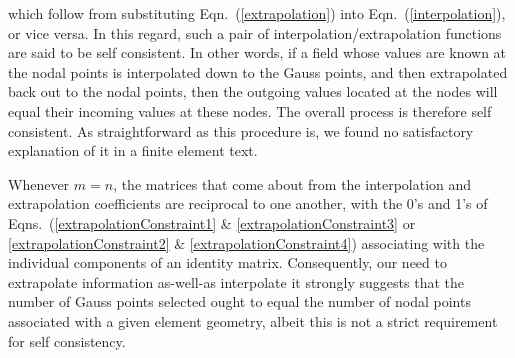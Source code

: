 which follow from substituting Eqn.~(\ref{extrapolation}) into Eqn.~(\ref{interpolation}), or vice versa.  In this regard, such a pair of interpolation\slash extrapolation functions are said to be self consistent.  In other words, if a field whose values are known at the nodal points is interpolated down to the Gauss points, and then extrapolated back out to the nodal points, then the outgoing values located at the nodes will equal their incoming values at these nodes.  The overall process is therefore self consistent.  As straight\-forward as this procedure is, we found no satisfactory explanation of it in a finite element text.

Whenever $m=n$, the matrices that come about from the interpolation and extrapolation coefficients are reciprocal to one another, with the 0's and 1's of Eqns.~(\ref{extrapolationConstraint1} \& \ref{extrapolationConstraint3} or \ref{extrapolationConstraint2} \& \ref{extrapolationConstraint4}) associating with the individual components of an identity matrix.  Consequently, our need to extrapolate information as-well-as interpolate it strongly suggests that the number of Gauss points selected ought to equal the number of nodal points associated with a given element geometry, albeit this is not a strict requirement for self consistency.

